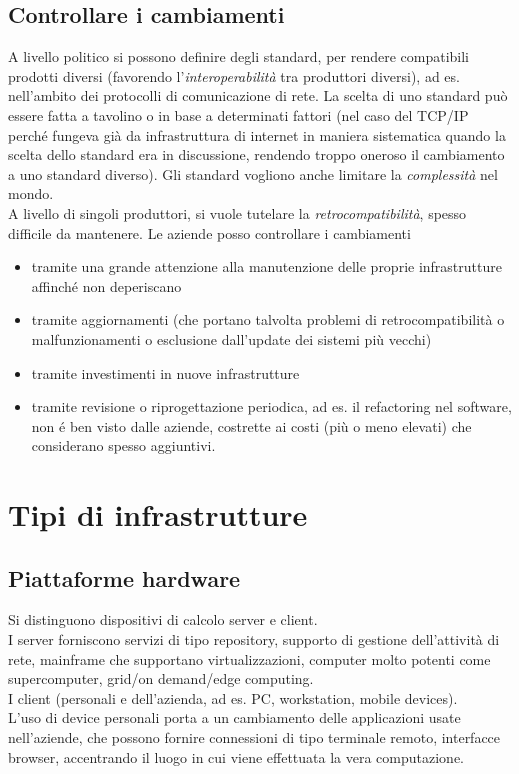 \subsection{Controllare i cambiamenti}
A livello politico si possono definire degli standard, per rendere compatibili prodotti diversi (favorendo l'\textit{interoperabilit\`a} tra produttori diversi), ad es. nell'ambito dei protocolli di comunicazione di rete. La scelta di uno standard pu\`o essere fatta a tavolino o in base a determinati fattori (nel caso del TCP/IP perch\'e fungeva gi\`a da infrastruttura di internet in maniera sistematica quando la scelta dello standard era in discussione, rendendo troppo oneroso il cambiamento a uno standard diverso).
Gli standard vogliono anche limitare la \textit{complessit\`a} nel mondo. \\
A livello di singoli produttori, si vuole tutelare la \textit{retrocompatibilit\`a}, spesso difficile da mantenere.
Le aziende posso controllare i cambiamenti
\begin{itemize}
\item tramite una grande attenzione alla manutenzione delle proprie infrastrutture affinch\'e non deperiscano
\item tramite aggiornamenti (che portano talvolta problemi di retrocompatibilit\`a o malfunzionamenti o esclusione dall'update dei sistemi pi\`u vecchi)
\item tramite investimenti in nuove infrastrutture
\item tramite revisione o riprogettazione periodica, ad es. il refactoring nel software, non \'e ben visto dalle aziende, costrette ai costi (pi\`u o meno elevati) che considerano spesso aggiuntivi.
\end{itemize}

\section{Tipi di infrastrutture}
\subsection{Piattaforme hardware}
Si distinguono dispositivi di calcolo server e client.\\
I server forniscono servizi di tipo repository, supporto di gestione dell'attivit\`a di rete, mainframe che supportano virtualizzazioni, computer molto potenti come supercomputer, grid/on demand/edge computing.\\
I client (personali e dell'azienda, ad es. PC, workstation, mobile devices).\\
L'uso di device personali porta a un cambiamento delle applicazioni usate nell'aziende, che possono fornire connessioni di tipo terminale remoto, interfacce browser, accentrando il luogo in cui viene effettuata la vera computazione.
